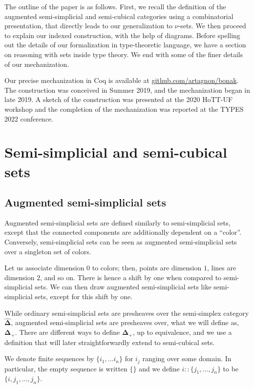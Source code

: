 \documentclass[10pt]{art.cls/art}
\newcommand{\DeltaHat}{\ensuremath{\hat{\boldsymbol{\Delta}}}}
\newcommand{\DeltaPlus}{\ensuremath{\boldsymbol{\Delta}_+}}
\begin{document}
The outline of the paper is as follows. First, we recall the definition of the augmented semi-simplicial and semi-cubical categories using a combinatorial presentation, that directly leads to our generalization to $\nu$-sets. We then proceed to explain our indexed construction, with the help of diagrams. Before spelling out the details of our formalization in type-theoretic language, we have a section on reasoning with sets inside type theory. We end with some of the finer details of our mechanization.

Our precise mechanization in Coq is available at \href{https://github.com/artagnon/bonak}{github.com/artagnon/bonak}. The construction was conceived in Summer 2019, and the mechanization began in late 2019. A sketch of the construction was presented at the 2020 HoTT-UF workshop and the completion of the mechanization was reported at the TYPES 2022 conference.

\section{Semi-simplicial and semi-cubical sets}
\subsection{Augmented semi-simplicial sets}
Augmented semi-simplicial sets are defined similarly to semi-simplicial sets, except that the connected components are additionally dependent on a ``color''. Conversely, semi-simplicial sets can be seen as augmented semi-simplicial sets over a singleton set of colors.

Let us associate dimension $0$ to colors; then, points are dimension $1$, lines are dimension $2$, and so on. There is hence a shift by one when compared to semi-simplicial sets. We can then draw augmented semi-simplicial sets like semi-simplicial sets, except for this shift by one.

While ordinary semi-simplicial sets are presheaves over the semi-simplex category \DeltaHat, augmented semi-simplicial sets are presheaves over, what we will define as, \DeltaPlus. There are different ways to define \DeltaPlus, up to equivalence, and we use a definition that will later straightforwardly extend to semi-cubical sets.

\begin{notation}
  We denote finite sequences by $\{i_1, \ldots i_n\}$ for $i_j$ ranging over some domain. In particular, the empty sequence is written $\{\}$ and we define $i :: \{j_1, \ldots, j_n\}$ to be $\{i, j_1, \ldots, j_n\}$.
\end{notation}
\end{document}

